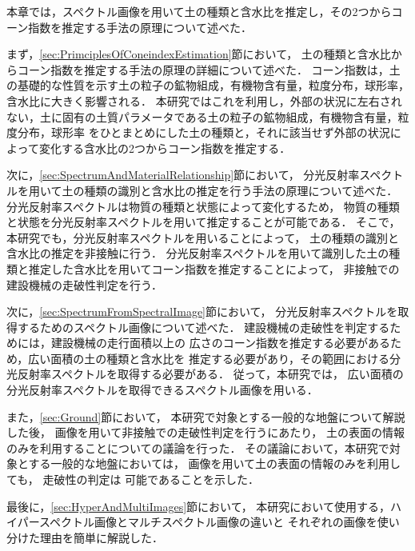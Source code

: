 本章では，スペクトル画像を用いて土の種類と含水比を推定し，その2つからコーン指数を推定する手法の原理について述べた．

まず，\ref{sec:PrimciplesOfConeindexEstimation}節において，
土の種類と含水比からコーン指数を推定する手法の原理の詳細について述べた．%
コーン指数は，土の基礎的な性質を示す土の粒子の鉱物組成，有機物含有量，粒度分布，球形率，含水比に大きく影響される．
本研究ではこれを利用し，外部の状況に左右されない，土に固有の土質パラメータである土の粒子の鉱物組成，有機物含有量，粒度分布，球形率
をひとまとめにした土の種類と，それに該当せず外部の状況によって変化する含水比の2つからコーン指数を推定する．

次に，\ref{sec:SpectrumAndMaterialRelationship}節において，
分光反射率スペクトルを用いて土の種類の識別と含水比の推定を行う手法の原理について述べた．
分光反射率スペクトルは物質の種類と状態によって変化するため，
物質の種類と状態を分光反射率スペクトルを用いて推定することが可能である．
そこで，本研究でも，分光反射率スペクトルを用いることによって，
土の種類の識別と含水比の推定を非接触に行う．
分光反射率スペクトルを用いて識別した土の種類と推定した含水比を用いてコーン指数を推定することによって，
非接触での建設機械の走破性判定を行う．

次に，\ref{sec:SpectrumFromSpectralImage}節において，
分光反射率スペクトルを取得するためのスペクトル画像について述べた．
建設機械の走破性を判定するためには，建設機械の走行面積以上の
広さのコーン指数を推定する必要があるため，広い面積の土の種類と含水比を
推定する必要があり，その範囲における分光反射率スペクトルを取得する必要がある．
従って，本研究では，
広い面積の分光反射率スペクトルを取得できるスペクトル画像を用いる．

また，\ref{sec:Ground}節において，
本研究で対象とする一般的な地盤について解説した後，
画像を用いて非接触での走破性判定を行うにあたり，
土の表面の情報のみを利用することについての議論を行った．
その議論において，本研究で対象とする一般的な地盤においては，
画像を用いて土の表面の情報のみを利用しても，
走破性の判定は
可能であることを示した．

最後に，\ref{sec:HyperAndMultiImages}節において，
本研究において使用する，ハイパースペクトル画像とマルチスペクトル画像の違いと
それぞれの画像を使い分けた理由を簡単に解説した．


